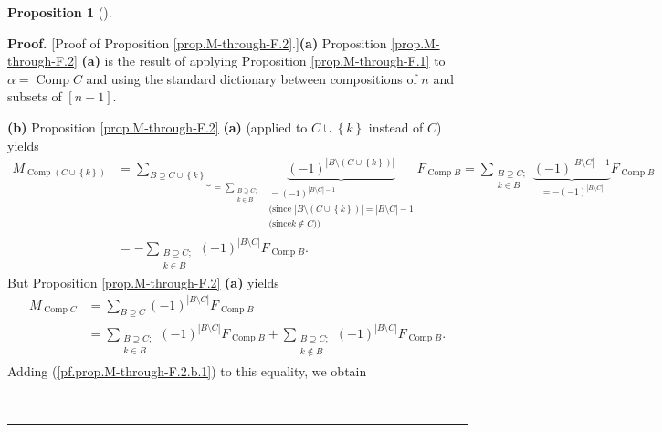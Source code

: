 \documentclass[numbers=enddot,12pt,final,onecolumn,notitlepage]{scrartcl}%
\theoremstyle{definition}
\newtheorem{prop}[theo]{Proposition}
\newenvironment{proposition}[1][]
{\begin{prop}[#1]\begin{leftbar}}
{\end{leftbar}\end{prop}}
\newenvironment{proof}[1][Proof]{\noindent\textbf{#1.} }{\ \rule{0.5em}{0.5em}}
\newenvironment{verlong}{}{}
\let\sumnonlimits\sum
\renewcommand{\sum}{\sumnonlimits\limits}
\begin{document}
\begin{verlong}
\begin{proposition}
\end{proposition}

\begin{proof}
[Proof of Proposition \ref{prop.M-through-F.2}.]\textbf{(a)} Proposition
\ref{prop.M-through-F.2} \textbf{(a)} is the result of applying Proposition
\ref{prop.M-through-F.1} to $\alpha=\operatorname*{Comp}C$ and using the
standard dictionary between compositions of $n$ and subsets of $\left[
n-1\right]  $.

\textbf{(b)} Proposition \ref{prop.M-through-F.2} \textbf{(a)} (applied to
$C\cup\left\{  k\right\}  $ instead of $C$) yields%
\begin{align}
M_{\operatorname*{Comp}\left(  C\cup\left\{  k\right\}  \right)  }  &
=\underbrace{\sum_{B\supseteq C\cup\left\{  k\right\}  }}_{=\sum
_{\substack{B\supseteq C;\\k\in B}}}\underbrace{\left(  -1\right)
^{\left\vert B\setminus\left(  C\cup\left\{  k\right\}  \right)  \right\vert
}}_{\substack{=\left(  -1\right)  ^{\left\vert B\setminus C\right\vert
-1}\\\text{(since }\left\vert B\setminus\left(  C\cup\left\{  k\right\}
\right)  \right\vert =\left\vert B\setminus C\right\vert -1\\\text{(since
}k\notin C\text{))}}}F_{\operatorname*{Comp}B}=\sum_{\substack{B\supseteq
C;\\k\in B}}\underbrace{\left(  -1\right)  ^{\left\vert B\setminus
C\right\vert -1}}_{=-\left(  -1\right)  ^{\left\vert B\setminus C\right\vert
}}F_{\operatorname*{Comp}B}\nonumber\\
&  =-\sum_{\substack{B\supseteq C;\\k\in B}}\left(  -1\right)  ^{\left\vert
B\setminus C\right\vert }F_{\operatorname*{Comp}B}.
\label{pf.prop.M-through-F.2.b.1}%
\end{align}
But Proposition \ref{prop.M-through-F.2} \textbf{(a)} yields
\begin{align*}
M_{\operatorname*{Comp}C}  &  =\sum_{B\supseteq C}\left(  -1\right)
^{\left\vert B\setminus C\right\vert }F_{\operatorname*{Comp}B}\\
&  =\sum_{\substack{B\supseteq C;\\k\in B}}\left(  -1\right)  ^{\left\vert
B\setminus C\right\vert }F_{\operatorname*{Comp}B}+\sum_{\substack{B\supseteq
C;\\k\notin B}}\left(  -1\right)  ^{\left\vert B\setminus C\right\vert
}F_{\operatorname*{Comp}B}.
\end{align*}
Adding (\ref{pf.prop.M-through-F.2.b.1}) to this equality, we obtain%

\end{proof}
\end{verlong}
\end{document}
